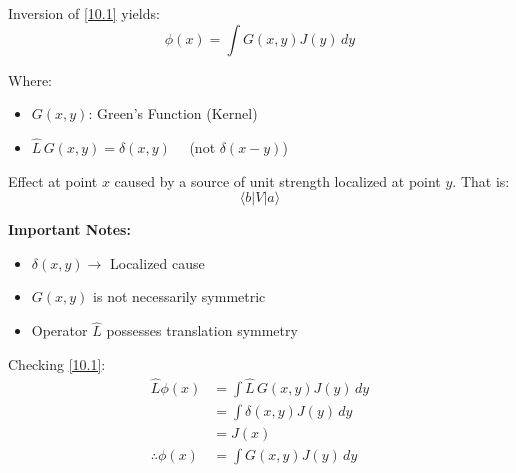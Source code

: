 \documentclass[14pt]{article} %
\begin{document}
Inversion of \eqref{10.1} yields:
\[
\phi(x) = \int G(x, y) J(y) \, dy
\]

Where:

\begin{itemize}
    \item \( G(x,y) \): Green’s Function (Kernel)
    \item \( \hat{L} \, G(x, y) = \delta(x,y) \quad \) (not \( \delta(x-y) \))
\end{itemize}
Effect at point $x$ caused by a source of unit strength localized at point $y$. That is: 
$$\langle b | V | a \rangle$$
\vspace{0.5cm}

\textbf{Important Notes:}
\begin{itemize}
    \item \( \delta(x, y) \rightarrow \) Localized cause
    \item \( G(x, y) \) is not necessarily symmetric
    \item Operator \( \hat{L} \) possesses translation symmetry
\end{itemize}
\begin{tcolorbox}
Checking \eqref{10.1}:
\begin{align*}
    \hat{L} \phi(x) &= \int \hat{L}\,G (x,y) J(y) \, dy \\
    &= \int \delta(x,y) J(y) \, dy \\
    &= J(x) \\
    \therefore \phi(x) &= \int G(x,y) J(y) \, dy
\end{align*}
\end{tcolorbox}
\end{document}
